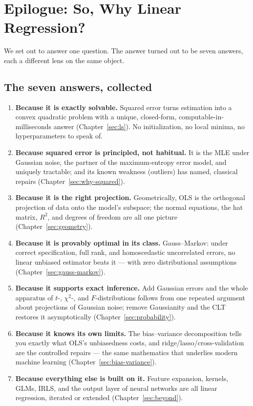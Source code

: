\section{Epilogue: So, Why Linear Regression?}\label{sec:epilogue}

We set out to answer one question. The answer turned out to be seven answers, each a different lens on the same object.

\subsection{The seven answers, collected}

\begin{enumerate}[label=\textbf{\arabic*.}]
  \item \textbf{Because it is exactly solvable.} Squared error turns estimation into a convex quadratic problem with a unique, closed-form, computable-in-milliseconds answer (Chapter~\ref{sec:ls}). No initialization, no local minima, no hyperparameters to speak of.
  \item \textbf{Because squared error is principled, not habitual.} It is the MLE under Gaussian noise, the partner of the maximum-entropy error model, and uniquely tractable; and its known weakness (outliers) has named, classical repairs (Chapter~\ref{sec:why-squared}).
  \item \textbf{Because it is the right projection.} Geometrically, OLS is the orthogonal projection of data onto the model's subspace; the normal equations, the hat matrix, $R^2$, and degrees of freedom are all one picture (Chapter~\ref{sec:geometry}).
  \item \textbf{Because it is provably optimal in its class.} Gauss--Markov: under correct specification, full rank, and homoscedastic uncorrelated errors, no linear unbiased estimator beats it — with zero distributional assumptions (Chapter~\ref{sec:gauss-markov}).
  \item \textbf{Because it supports exact inference.} Add Gaussian errors and the whole apparatus of $t$-, $\chi^2$-, and $F$-distributions follows from one repeated argument about projections of Gaussian noise; remove Gaussianity and the CLT restores it asymptotically (Chapter~\ref{sec:probability}).
  \item \textbf{Because it knows its own limits.} The bias--variance decomposition tells you exactly what OLS's unbiasedness costs, and ridge/lasso/cross-validation are the controlled repairs — the same mathematics that underlies modern machine learning (Chapter~\ref{sec:bias-variance}).
  \item \textbf{Because everything else is built on it.} Feature expansion, kernels, GLMs, IRLS, and the output layer of neural networks are all linear regression, iterated or extended (Chapter~\ref{sec:beyond}).
\end{enumerate}

